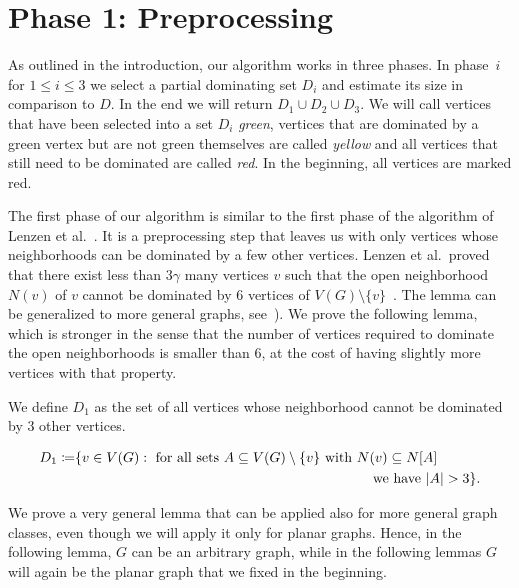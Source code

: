 
\section{Phase 1: Preprocessing}\label{sec:step1}

As outlined in the introduction, our algorithm works in three phases.
In phase~$i$ for $1\leq i\leq 3$ we select a partial dominating set
$D_i$ and estimate its size in comparison to $D$. In the end we will
return $D_1\cup D_2\cup D_3$. We will call vertices that have been selected
into a set $D_i$ \emph{green}, vertices that are dominated by a green
vertex but are not green themselves are called \emph{yellow} and all
vertices that still need to be dominated are called \emph{red}. In the
beginning, all vertices are marked red.

The first phase of our algorithm is similar to the first phase of the
algorithm of Lenzen et al.~\cite{lenzen2013distributed}. It is a
preprocessing step that leaves us with only vertices whose
neighborhoods can be dominated by a few other vertices. Lenzen et al.\
proved that there exist less than $3\gamma$
many vertices $v$ such
that the open neighborhood~$N(v)$ of $v$ cannot be dominated by $6$
vertices of $V(G)\setminus \{v\}$~\cite[Lemma
6.3]{lenzen2013distributed}. The lemma can be generalized to more
general graphs, see~\cite{amiri2019distributed}). We prove the
following lemma, which is stronger in the sense that the number of
vertices required to dominate the open neighborhoods is smaller than
$6$, at the cost of having slightly more vertices with that property.

\smallskip We define $D_1$ as the set of all vertices whose
neighborhood cannot be dominated by $3$ other vertices.
\begin{tcolorbox}[colback=red!5!white,colframe=red!50!black]
\vspace{-4mm}
  \begin{align*}
  D_1\coloneqq & \{v\in V(G) : \text{ for all sets } A\subseteq V(G)\setminus \{v\}
   \text{ with $N(v)\subseteq N[A]$}\\ 
  & \hspace{7.5cm}\text{we have $|A|> 3\}$.}
  \end{align*}
\end{tcolorbox}

\smallskip

We prove a very general lemma that can be applied also for more
general graph classes, even though we will apply it only for planar
graphs.  Hence, in the following lemma, $G$ can be an arbitrary graph,
while in the following lemmas $G$ will again be the planar graph that
we fixed in the beginning.



